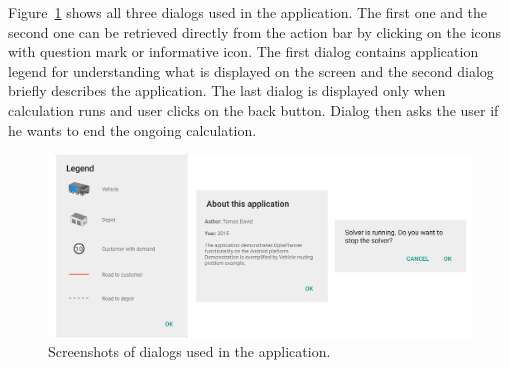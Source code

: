 Figure~\ref{DialogsFigure} shows all three dialogs used in the application. The first one and the second one can be
retrieved directly from the action bar by clicking on the icons with question mark or informative icon. The first dialog
contains application legend for understanding what is displayed on the screen and the second dialog briefly describes
the application. The last dialog is displayed only when calculation runs and user clicks on the back button. Dialog then
asks the user if he wants to end the ongoing calculation.

\begin{figure}[h!]
    \centering
    \includegraphics[scale=0.15]{fig/dialogs.png}
    \caption{Screenshots of dialogs used in the application.}
    \label{DialogsFigure}
\end{figure}
